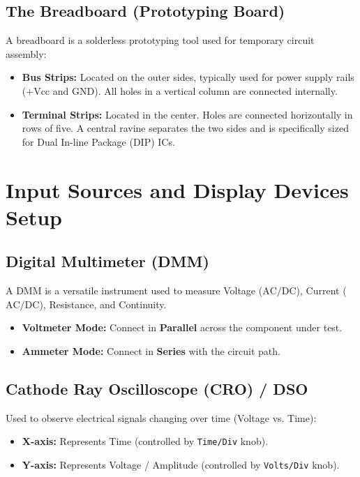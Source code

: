 \subsection{The Breadboard (Prototyping Board)}
A breadboard is a solderless prototyping tool used for temporary circuit assembly:
\begin{itemize}
    \item \textbf{Bus Strips:} Located on the outer sides, typically used for power supply rails ($+\text{Vcc}$ and $\text{GND}$). All holes in a vertical column are connected internally.
    \item \textbf{Terminal Strips:} Located in the center. Holes are connected horizontally in rows of five. A central ravine separates the two sides and is specifically sized for Dual In-line Package (DIP) ICs.
\end{itemize}

\section{Input Sources and Display Devices Setup}

\subsection{Digital Multimeter (DMM)}
A DMM is a versatile instrument used to measure Voltage ($\text{AC/DC}$), Current ($\text{AC/DC}$), Resistance, and Continuity.
\begin{itemize}
    \item \textbf{Voltmeter Mode:} Connect in \textbf{Parallel} across the component under test.
    \item \textbf{Ammeter Mode:} Connect in \textbf{Series} with the circuit path.
\end{itemize}

\subsection{Cathode Ray Oscilloscope (CRO) / DSO}
Used to observe electrical signals changing over time (Voltage vs. Time):
\begin{itemize}
    \item \textbf{X-axis:} Represents Time (controlled by \texttt{Time/Div} knob).
    \item \textbf{Y-axis:} Represents Voltage / Amplitude (controlled by \texttt{Volts/Div} knob).
\end{itemize}

